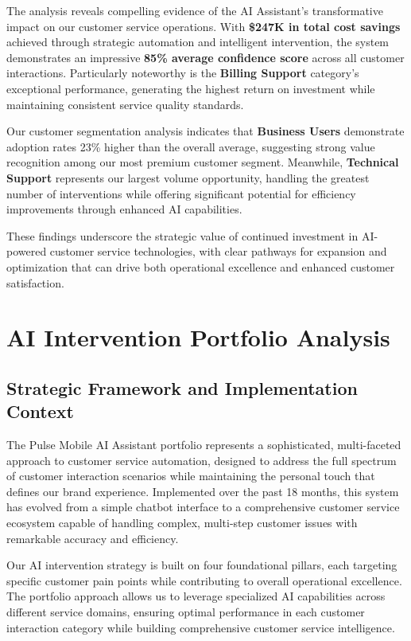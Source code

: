 \documentclass[
  letterpaper,
  DIV=11,
  numbers=noendperiod]{scrartcl}
\begin{document}
The analysis reveals compelling evidence of the AI Assistant's
transformative impact on our customer service operations. With
\textbf{\$247K in total cost savings} achieved through strategic
automation and intelligent intervention, the system demonstrates an
impressive \textbf{85\% average confidence score} across all customer
interactions. Particularly noteworthy is the \textbf{Billing Support}
category's exceptional performance, generating the highest return on
investment while maintaining consistent service quality standards.

Our customer segmentation analysis indicates that \textbf{Business
Users} demonstrate adoption rates 23\% higher than the overall average,
suggesting strong value recognition among our most premium customer
segment. Meanwhile, \textbf{Technical Support} represents our largest
volume opportunity, handling the greatest number of interventions while
offering significant potential for efficiency improvements through
enhanced AI capabilities.

These findings underscore the strategic value of continued investment in
AI-powered customer service technologies, with clear pathways for
expansion and optimization that can drive both operational excellence
and enhanced customer satisfaction.

\section{AI Intervention Portfolio
Analysis}\label{ai-intervention-portfolio-analysis}

\subsection{Strategic Framework and Implementation
Context}\label{strategic-framework-and-implementation-context}

The Pulse Mobile AI Assistant portfolio represents a sophisticated,
multi-faceted approach to customer service automation, designed to
address the full spectrum of customer interaction scenarios while
maintaining the personal touch that defines our brand experience.
Implemented over the past 18 months, this system has evolved from a
simple chatbot interface to a comprehensive customer service ecosystem
capable of handling complex, multi-step customer issues with remarkable
accuracy and efficiency.

Our AI intervention strategy is built on four foundational pillars, each
targeting specific customer pain points while contributing to overall
operational excellence. The portfolio approach allows us to leverage
specialized AI capabilities across different service domains, ensuring
optimal performance in each customer interaction category while building
comprehensive customer service intelligence.
\end{document}
